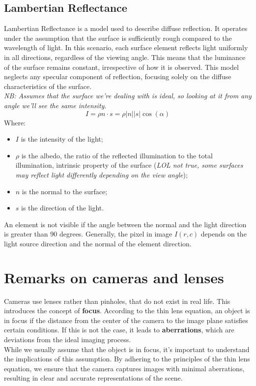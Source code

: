 \subsection{Lambertian Reflectance}
Lambertian Reflectance is a model used to describe diffuse reflection. It operates under the assumption that the surface is sufficiently rough compared to the wavelength of light. In this scenario, each surface element reflects light uniformly in all directions, regardless of the viewing angle. This means that the luminance of the surface remains constant, irrespective of how it is observed. 
This model neglects any specular component of reflection, focusing solely on the diffuse characteristics of the surface.
\\\textit{NB: Assumes that the surface we're dealing with is ideal, so looking at it from any angle we'll see the same intensity.}
\[
    I = \rho n \cdot s = \rho|n||s|\cos(\alpha) 
\]
Where:
\begin{itemize}
    \item $I$ is the intensity of the light;
    \item $\rho$ is the albedo, the ratio of the reflected illumination to the total illumination, intrinsic property of the surface (\textit{LOL not true, some surfaces may reflect light differently depending on the view angle});
    \item $n$ is the normal to the surface;
    \item $s$ is the direction of the light.
\end{itemize}

An element is not visible if the angle between the normal and the light direction is greater than 90 degrees.
Generally, the pixel in image $I(r,c)$ depends on the light source direction and the normal of the element direction.

\section{Remarks on cameras and lenses}
Cameras use lenses rather than pinholes, that do not exist in real life. This introduces the concept of \textbf{focus}. 
According to the thin lens equation, an object is in focus if the distance from the center of the camera to the image plane satisfies certain conditions. 
If this is not the case, it leads to \textbf{aberrations}, which are deviations from the ideal imaging process.
\\
While we usually assume that the object is in focus, it's important to understand the implications of this assumption. 
By adhering to the principles of the thin lens equation, we ensure that the camera captures images with minimal aberrations, resulting in clear and accurate representations of the scene.
